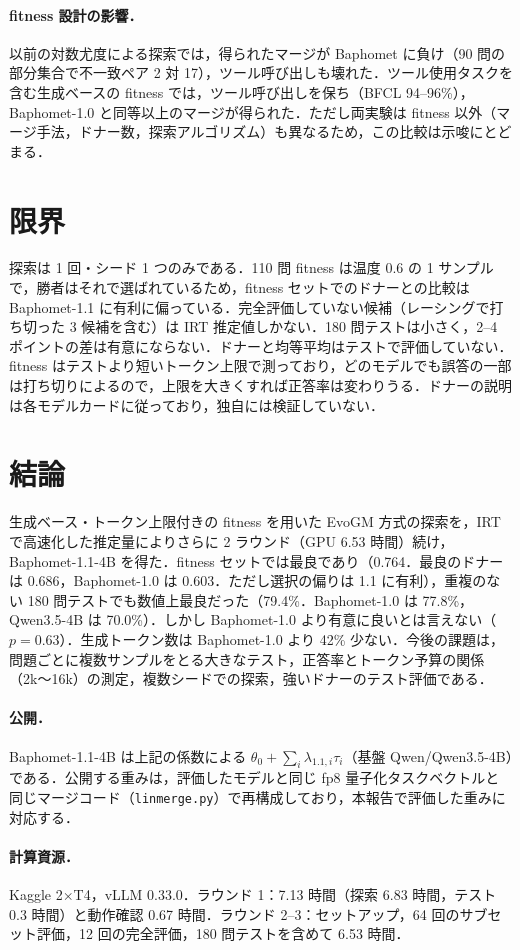 \paragraph{fitness 設計の影響．}以前の対数尤度による探索では，得られたマージが Baphomet に負け（90 問の部分集合で不一致ペア 2 対 17），ツール呼び出しも壊れた．ツール使用タスクを含む生成ベースの fitness では，ツール呼び出しを保ち（BFCL 94--96\%），Baphomet-1.0 と同等以上のマージが得られた．ただし両実験は fitness 以外（マージ手法，ドナー数，探索アルゴリズム）も異なるため，この比較は示唆にとどまる．

\section{限界}
探索は 1 回・シード 1 つのみである．110 問 fitness は温度 0.6 の 1 サンプルで，勝者はそれで選ばれているため，fitness セットでのドナーとの比較は Baphomet-1.1 に有利に偏っている．完全評価していない候補（レーシングで打ち切った 3 候補を含む）は IRT 推定値しかない．180 問テストは小さく，2--4 ポイントの差は有意にならない．ドナーと均等平均はテストで評価していない．fitness はテストより短いトークン上限で測っており，どのモデルでも誤答の一部は打ち切りによるので，上限を大きくすれば正答率は変わりうる．ドナーの説明は各モデルカードに従っており，独自には検証していない．

\section{結論}
生成ベース・トークン上限付きの fitness を用いた EvoGM 方式の探索を，IRT で高速化した推定量によりさらに 2 ラウンド（GPU 6.53 時間）続け，Baphomet-1.1-4B を得た．fitness セットでは最良であり（0.764．最良のドナーは 0.686，Baphomet-1.0 は 0.603．ただし選択の偏りは 1.1 に有利），重複のない 180 問テストでも数値上最良だった（79.4\%．Baphomet-1.0 は 77.8\%，Qwen3.5-4B は 70.0\%）．しかし Baphomet-1.0 より有意に良いとは言えない（$p=0.63$）．生成トークン数は Baphomet-1.0 より 42\% 少ない．今後の課題は，問題ごとに複数サンプルをとる大きなテスト，正答率とトークン予算の関係（2k〜16k）の測定，複数シードでの探索，強いドナーのテスト評価である．

\paragraph{公開．}Baphomet-1.1-4B は上記の係数による $\theta_0+\sum_i\lambda_{1.1,i}\tau_i$（基盤 Qwen/Qwen3.5-4B）である．公開する重みは，評価したモデルと同じ fp8 量子化タスクベクトルと同じマージコード（\texttt{linmerge.py}）で再構成しており，本報告で評価した重みに対応する．

\paragraph{計算資源．}Kaggle 2$\times$T4，vLLM 0.33.0．ラウンド 1：7.13 時間（探索 6.83 時間，テスト 0.3 時間）と動作確認 0.67 時間．ラウンド 2--3：セットアップ，64 回のサブセット評価，12 回の完全評価，180 問テストを含めて 6.53 時間．

